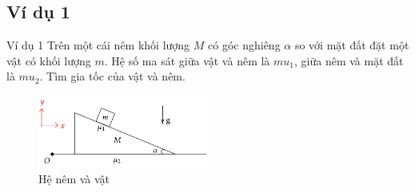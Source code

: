 \subsection{Ví dụ 1}
\begin{frame}{Ví dụ 1}
Trên một cái nêm khối lượng \(M\) có góc nghiêng \(\alpha\) so với mặt đất đặt một vật có khối lượng \(m\). Hệ số ma sát giữa vật và nêm là \(mu_1\), giữa nêm và mặt đất là \(mu_2\). Tìm gia tốc của vật và nêm.
\begin{figure}
    \centering
    \includegraphics[width=0.5\textwidth]{Slides/Figure/wedgemass.png}
    \caption{Hệ nêm và vật}
\end{figure}
\end{frame}

